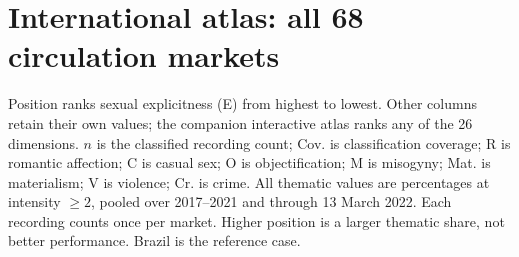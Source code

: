 \documentclass[10pt,a4paper,twocolumn]{article}
\begin{document}
\section*{International atlas: all 68 circulation markets}
\noindent\small Position ranks sexual explicitness (E) from highest to lowest. Other columns retain their own values; the companion interactive atlas ranks any of the 26 dimensions. $n$ is the classified recording count; Cov. is classification coverage; R is romantic affection; C is casual sex; O is objectification; M is misogyny; Mat. is materialism; V is violence; Cr. is crime. All thematic values are percentages at intensity $\geq2$, pooled over 2017--2021 and through 13 March 2022. Each recording counts once per market. Higher position is a larger thematic share, not better performance. Brazil is the reference case.\par\vspace{4pt}
\centering
\fontsize{8}{9}\selectfont\setlength{\tabcolsep}{4pt}
\end{document}
